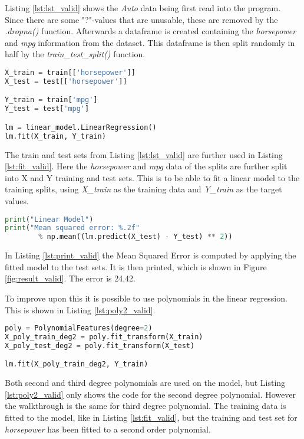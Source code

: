 Listing \ref{lst:lst_valid} shows the \emph{Auto} data being first read into the program. Since there are some "?"-values that are unusable, these are removed by the \emph{.dropna()} function.
Afterwards a dataframe is created containing the \emph{horsepower} and \emph{mpg} information from the dataset. This dataframe is then split randomly in half by the \emph{train\_test\_split()} function. 

\begin{lstlisting}[language=Python, label=lst:fit_valid, caption=Fit linear regression]
X_train = train[['horsepower']]
X_test = test[['horsepower']]

Y_train = train['mpg']
Y_test = test['mpg']

lm = linear_model.LinearRegression()
lm.fit(X_train, Y_train)
\end{lstlisting}

The train and test sets from Listing \ref{lst:lst_valid} are further used in Listing \ref{lst:fit_valid}. Here the \emph{horsepower} and \emph{mpg} data of the splits are further split into X and Y training and test sets. This is to be able to fit a linear model to the training splits, using \emph{X\_train} as the training data and \emph{Y\_train} as the target values.

\begin{lstlisting}[language=Python, label=lst:print_valid, caption=Fit linear regression]
print("Linear Model")
print("Mean squared error: %.2f" 
		% np.mean((lm.predict(X_test) - Y_test) ** 2))
\end{lstlisting}

In Listing \ref{lst:print_valid} the Mean Squared Error is computed by applying the fitted model to the test sets. It is then printed, which is shown in Figure \ref{fig:result_valid}. The error is 24,42. 

To improve upon this it is possible to use polynomials in the linear regression. This is shown in Listing \ref{lst:poly2_valid}.

\begin{lstlisting}[language=Python, label=lst:poly2_valid, caption=Polynomial features with degree = 2]
poly = PolynomialFeatures(degree=2)
X_poly_train_deg2 = poly.fit_transform(X_train)
X_poly_test_deg2 = poly.fit_transform(X_test)

lm.fit(X_poly_train_deg2, Y_train)
\end{lstlisting}

Both second and third degree polynomials are used on the model, but Listing \ref{lst:poly2_valid} only shows the code for the second degree polynomial. However the walkthrough is the same for third degree polynomial. The training data is fitted to the model, like in Listing \ref{lst:fit_valid}, but the training and test set for \emph{horsepower} has been fitted to a second order polynomial. 

